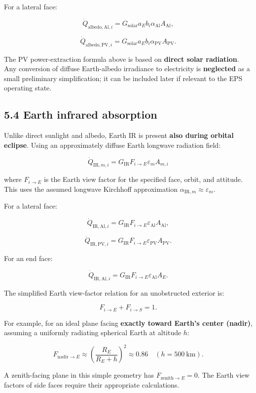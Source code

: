 \documentclass[
]{book}
\begin{document}
For a lateral face:

\[
\dot Q_{\mathrm{albedo,Al},i}
=G_{\mathrm{solar}}a_Eb_i\alpha_{\mathrm{Al}}A_{\mathrm{Al}},
\]

\[
\dot Q_{\mathrm{albedo,PV},i}
=G_{\mathrm{solar}}a_Eb_i\alpha_{\mathrm{PV}}A_{\mathrm{PV}}.
\]

The PV power-extraction formula above is based on \textbf{direct solar radiation}. Any conversion of diffuse Earth-albedo irradiance to electricity is \textbf{neglected} as a small preliminary simplification; it can be included later if relevant to the EPS operating state.

\subsection{5.4 Earth infrared absorption}\label{earth-infrared-absorption}

Unlike direct sunlight and albedo, Earth IR is present \textbf{also during orbital eclipse}. Using an approximately diffuse Earth longwave radiation field:

\[
\boxed{
\dot Q_{\mathrm{IR},m,i}
=G_{\mathrm{IR}}F_{i\to E}\varepsilon_m A_{m,i}
}
\]

where \(F_{i\to E}\) is the Earth view factor for the specified face, orbit, and attitude. This uses the assumed longwave Kirchhoff approximation \(\alpha_{\mathrm{IR},m}\approx\varepsilon_m\).

For a lateral face:

\[
\dot Q_{\mathrm{IR,Al},i}
=G_{\mathrm{IR}}F_{i\to E}\varepsilon_{\mathrm{Al}}A_{\mathrm{Al}},
\]

\[
\dot Q_{\mathrm{IR,PV},i}
=G_{\mathrm{IR}}F_{i\to E}\varepsilon_{\mathrm{PV}}A_{\mathrm{PV}}.
\]

For an end face:

\[
\dot Q_{\mathrm{IR,Al},i}
=G_{\mathrm{IR}}F_{i\to E}\varepsilon_{\mathrm{Al}}A_E.
\]

The simplified Earth view-factor relation for an unobstructed exterior is:

\[
F_{i\to E}+F_{i\to S}=1.
\]

For example, for an ideal plane facing \textbf{exactly toward Earth's center (nadir)}, assuming a uniformly radiating spherical Earth at altitude \(h\):

\[
F_{\mathrm{nadir}\to E}\approx
\left(\frac{R_E}{R_E+h}\right)^2
\approx0.86\quad(h=500\ \mathrm{km}).
\]

A zenith-facing plane in this simple geometry has \(F_{\mathrm{zenith}\to E}=0\). The Earth view factors of side faces require their appropriate calculations.
\end{document}
